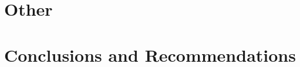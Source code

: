\documentclass[a4paper,12pt]{article}
\begin{document}
	
	
	\section{Other}	 
		
		
		
		
		
	\section{Conclusions and Recommendations}	 
		
	
	
\end{document}
